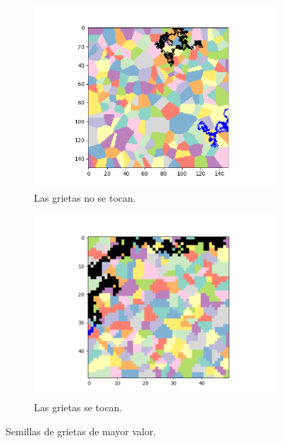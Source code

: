 \documentclass{article}
\begin{document}
\begin{figure}
     \centering
     \begin{subfigure}[b]{0.45\textwidth}
         \centering
         \includegraphics[width=\textwidth]{Figure_3.png}
         \caption{Las grietas no se tocan.}
         \label{fig:notocan}
     \end{subfigure}
     \begin{subfigure}[b]{0.45\textwidth}
         \centering
         \includegraphics[width=\textwidth]{Figure_4.png}
         \caption{Las grietas se tocan.}
         \label{fig:tocan}
     \end{subfigure}
     \caption{Semillas de grietas de mayor valor.}
     \label{grietas}
      

\end{figure}
\end{document}
